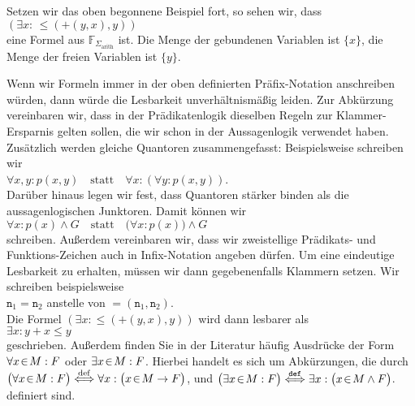 \example
Setzen wir das oben begonnene Beispiel fort, so  sehen wir, dass \\[0.2cm]
\hspace*{1.3cm} $(\exists x \colon\, \leq\!(\mathtt{+}(y, x),y))$ \\[0.2cm]
eine Formel aus $\mathbb{F}_{\Sigma_{\mathrm{arith}}}$ ist. 
Die Menge der gebundenen Variablen ist $\{x\}$, die Menge der freien Variablen ist 
$\{ y \}$. \eox

Wenn wir Formeln immer in der oben definierten Pr\"{a}fix-Notation anschreiben w\"{u}rden, dann w\"{u}rde die Lesbarkeit unverh\"{a}ltnism\"{a}\ss{}ig leiden. 
Zur Abk\"{u}rzung vereinbaren wir, dass in der Pr\"{a}dikatenlogik dieselben Regeln zur Klammer-Ersparnis
gelten sollen,  die wir schon in der Aussagenlogik verwendet haben.  Zus\"{a}tzlich werden
gleiche Quantoren zusammengefasst: Beispielsweise schreiben wir  
\\[0.2cm]
\hspace*{1.3cm}
$\forall x, y \colon p(x, y)  \quad \mathrm{statt} \quad \forall x \colon ( \forall y \colon p(x,y))$.
\\[0.2cm]
Dar\"{u}ber hinaus legen wir fest, dass Quantoren st\"{a}rker binden als die aussagenlogischen Junktoren.
Damit k\"{o}nnen wir
\\[0.2cm]
\hspace*{1.3cm}
$\forall x \colon p(x) \wedge G \quad \mathrm{statt} \quad \bigl(\forall x \colon p(x)\bigr) \wedge G$
\\[0.2cm]
schreiben.
Au\ss{}erdem vereinbaren wir, dass wir zweistellige Pr\"{a}dikats- und Funktions-Zeichen auch in Infix-Notation angeben
d\"{u}rfen.  Um eine eindeutige Lesbarkeit zu erhalten, m\"{u}ssen wir dann gegebenenfalls Klammern setzen. 
Wir schreiben beispielsweise \\[0.2cm]
\hspace*{1.3cm} $\mathtt{n}_1 = \mathtt{n}_2$  \quad anstelle von \quad $=(\mathtt{n}_1, \mathtt{n}_2)$. \\[0.2cm]
Die Formel $(\exists x \colon \leq(\mathtt{+}(y, x),y))$ wird dann lesbarer als \\[0.2cm]
\hspace*{1.3cm} $\exists x \colon y + x \leq y$ \\[0.2cm]
geschrieben.  Au\ss{}erdem finden Sie in der Literatur h\"{a}ufig Ausdr\"{u}cke der Form
$\forall x\!\in\! M: F$ oder $\exists x\!\in\! M: F$.  Hierbei handelt es sich um Abk\"{u}rzungen, die durch
\\[0.2cm]
\hspace*{1.3cm}
$\displaystyle \bigl(\forall x\!\in\! M: F\bigr) \stackrel{\mathrm{def}}{\Longleftrightarrow} \forall x: \bigl(x \!\in\! M \rightarrow F\bigr)$,
\quad und \quad 
$\displaystyle\bigl(\exists x\!\in\! M: F\bigr) \stackrel{\mathtt{def}}{\Longleftrightarrow} \exists x: \bigl(x \!\in\! M \wedge F\bigr)$.
\\[0.2cm]
definiert sind.

